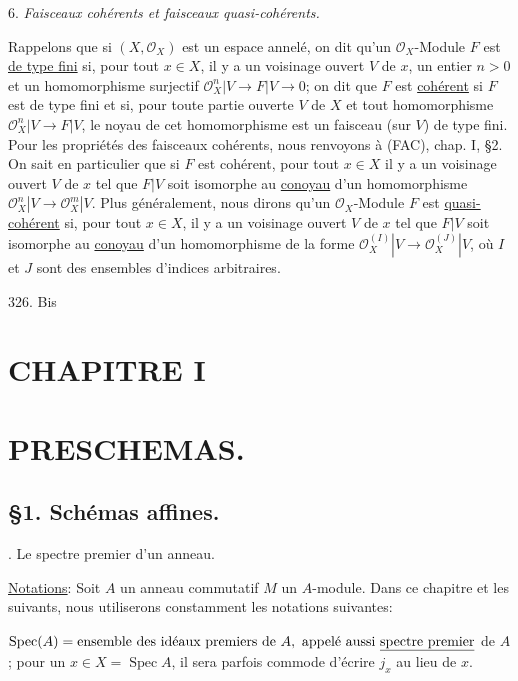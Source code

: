 6. \emph{Faisceaux cohérents et faisceaux quasi-cohérents.}

Rappelons que si $(X, \mathcal{O}_X)$ est un espace annelé, on dit qu'un $\mathcal{O}_X$-Module $F$ est \underline{de type fini} si, pour tout $x \in X$, il y a un voisinage ouvert $V$ de $x$, un entier $n > 0$ et un homomorphisme surjectif $\mathcal{O}_X^n|V \to F|V \to 0$; on dit que $F$ est \underline{cohérent} si $F$ est de type fini et si, pour toute partie ouverte $V$ de $X$ et tout homomorphisme $\mathcal{O}_X^n|V \to F|V$, le noyau de cet homomorphisme est un faisceau (sur $V$) de type fini. Pour les propriétés des faisceaux cohérents, nous renvoyons à (FAC), chap. I, §2. On sait en particulier que si $F$ est cohérent, pour tout $x \in X$ il y a un voisinage ouvert $V$ de $x$ tel que $F|V$ soit isomorphe au \underline{conoyau} d'un homomorphisme $\mathcal{O}_X^n|V \to \mathcal{O}_X^m|V$. Plus généralement, nous dirons qu'un $\mathcal{O}_X$-Module $F$ est \underline{quasi-cohérent} si, pour tout $x \in X$, il y a un voisinage ouvert $V$ de $x$ tel que $F|V$ soit isomorphe au \underline{conoyau} d'un homomorphisme de la forme $\mathcal{O}_X^{(I)}|V \to \mathcal{O}_X^{(J)}|V$, où $I$ et $J$ sont des ensembles d'indices arbitraires.

\newpage


 \hfill 326. Bis

\section*{CHAPITRE I}
\section*{PRESCHEMAS.}

\subsection*{§1. Schémas affines.}

. Le spectre premier d'un anneau.

\noindent \underline{Notations}: Soit $A$ un anneau commutatif $M$ un $A$-module. Dans ce chapitre et les suivants, nous utiliserons constamment les notations suivantes:

$\operatorname{Spec}(A) = \text{ensemble des idéaux premiers de } A, \text{ appelé aussi \underline{spectre premier}}$
de $A$; pour un $x \in X = \operatorname{Spec} A$, il sera parfois commode d'écrire
$j_x$ au lieu de $x$.

